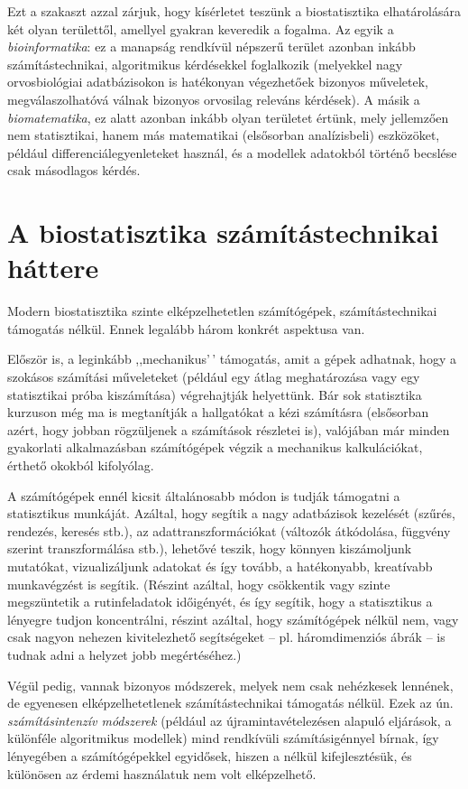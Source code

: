 \documentclass[
]{book}
\begin{document}
Ezt a szakaszt azzal zárjuk, hogy kísérletet teszünk a biostatisztika elhatárolására két olyan területtől, amellyel gyakran keveredik a fogalma. Az egyik a \emph{bioinformatika}: ez a manapság rendkívül népszerű terület azonban inkább számítástechnikai, algoritmikus kérdésekkel foglalkozik (melyekkel nagy orvosbiológiai adatbázisokon is hatékonyan végezhetőek bizonyos műveletek, megválaszolhatóvá válnak bizonyos orvosilag releváns kérdések). A másik a \emph{biomatematika}, ez alatt azonban inkább olyan területet értünk, mely jellemzően nem statisztikai, hanem más matematikai (elsősorban analízisbeli) eszközöket, például differenciálegyenleteket használ, és a modellek adatokból történő becslése csak másodlagos kérdés.

\hypertarget{alapokszamtech}{%
\section{A biostatisztika számítástechnikai háttere}\label{alapokszamtech}}

Modern biostatisztika szinte elképzelhetetlen számítógépek, számítástechnikai támogatás nélkül. Ennek legalább három konkrét aspektusa van.

Először is, a leginkább ,,mechanikus'\,' támogatás, amit a gépek adhatnak, hogy a szokásos számítási műveleteket (például egy átlag meghatározása vagy egy statisztikai próba kiszámítása) végrehajtják helyettünk. Bár sok statisztika kurzuson még ma is megtanítják a hallgatókat a kézi számításra (elsősorban azért, hogy jobban rögzüljenek a számítások részletei is), valójában már minden gyakorlati alkalmazásban számítógépek végzik a mechanikus kalkulációkat, érthető okokból kifolyólag.

A számítógépek ennél kicsit általánosabb módon is tudják támogatni a statisztikus munkáját. Azáltal, hogy segítik a nagy adatbázisok kezelését (szűrés, rendezés, keresés stb.), az adattranszformációkat (változók átkódolása, függvény szerint transzformálása stb.), lehetővé teszik, hogy könnyen kiszámoljunk mutatókat, vizualizáljunk adatokat és így tovább, a hatékonyabb, kreatívabb munkavégzést is segítik. (Részint azáltal, hogy csökkentik vagy szinte megszüntetik a rutinfeladatok időigényét, és így segítik, hogy a statisztikus a lényegre tudjon koncentrálni, részint azáltal, hogy számítógépek nélkül nem, vagy csak nagyon nehezen kivitelezhető segítségeket -- pl. háromdimenziós ábrák -- is tudnak adni a helyzet jobb megértéséhez.)

Végül pedig, vannak bizonyos módszerek, melyek nem csak nehézkesek lennének, de egyenesen elképzelhetetlenek számítástechnikai támogatás nélkül. Ezek az ún. \emph{számításintenzív módszerek} (például az újramintavételezésen alapuló eljárások, a különféle algoritmikus modellek) mind rendkívüli számításigénnyel bírnak, így lényegében a számítógépekkel egyidősek, hiszen a nélkül kifejlesztésük, és különösen az érdemi használatuk nem volt elképzelhető.
\end{document}
